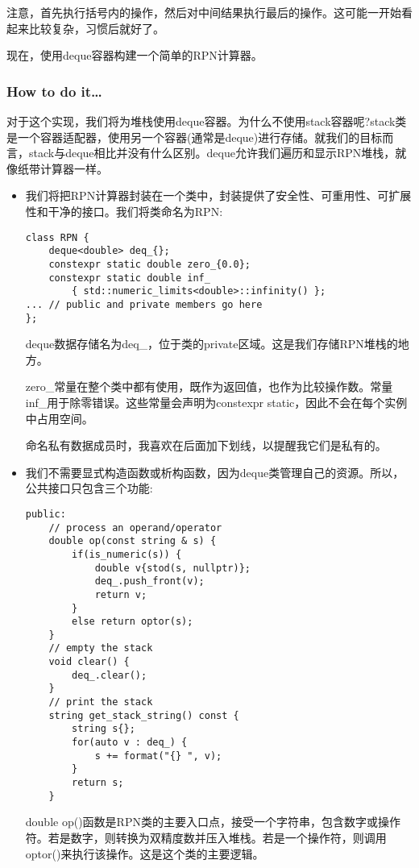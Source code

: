注意，首先执行括号内的操作，然后对中间结果执行最后的操作。这可能一开始看起来比较复杂，习惯后就好了。

现在，使用deque容器构建一个简单的RPN计算器。

\subsubsection{How to do it…}

对于这个实现，我们将为堆栈使用deque容器。为什么不使用stack容器呢?stack类是一个容器适配器，使用另一个容器(通常是deque)进行存储。就我们的目标而言，stack与deque相比并没有什么区别。deque允许我们遍历和显示RPN堆栈，就像纸带计算器一样。

\begin{itemize}
\item 
我们将把RPN计算器封装在一个类中，封装提供了安全性、可重用性、可扩展性和干净的接口。我们将类命名为RPN:

\begin{lstlisting}[style=styleCXX]
class RPN {
	deque<double> deq_{};
	constexpr static double zero_{0.0};
	constexpr static double inf_
		{ std::numeric_limits<double>::infinity() };
... // public and private members go here
};
\end{lstlisting}

deque数据存储名为deq\_，位于类的private区域。这是我们存储RPN堆栈的地方。

zero\_常量在整个类中都有使用，既作为返回值，也作为比较操作数。常量inf\_用于除零错误。这些常量会声明为constexpr static，因此不会在每个实例中占用空间。

命名私有数据成员时，我喜欢在后面加下划线，以提醒我它们是私有的。

\item 
我们不需要显式构造函数或析构函数，因为deque类管理自己的资源。所以，公共接口只包含三个功能:

\begin{lstlisting}[style=styleCXX]
public:
	// process an operand/operator
	double op(const string & s) {
		if(is_numeric(s)) {
			double v{stod(s, nullptr)};
			deq_.push_front(v);
			return v;
		}
		else return optor(s);
	}
	// empty the stack
	void clear() {
		deq_.clear();
	}
	// print the stack
	string get_stack_string() const {
		string s{};
		for(auto v : deq_) {
			s += format("{} ", v);
		}
		return s;
	}
\end{lstlisting}

double op()函数是RPN类的主要入口点，接受一个字符串，包含数字或操作符。若是数字，则转换为双精度数并压入堆栈。若是一个操作符，则调用optor()来执行该操作。这是这个类的主要逻辑。


\end{itemize}
